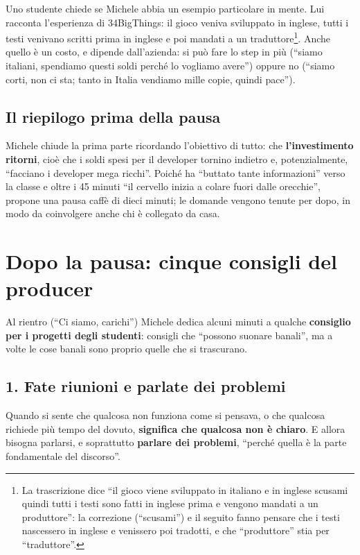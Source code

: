 Uno studente chiede se Michele abbia un esempio particolare in mente. Lui
racconta l'esperienza di 34BigThings: il gioco veniva sviluppato in inglese,
tutti i testi venivano scritti prima in inglese e poi mandati a un
traduttore\footnote{La trascrizione dice ``il gioco viene sviluppato in
italiano e in inglese scusami quindi tutti i testi sono fatti in inglese prima
e vengono mandati a un produttore'': la correzione (``scusami'') e il seguito
fanno pensare che i testi nascessero in inglese e venissero poi tradotti, e che
``produttore'' stia per ``traduttore''.}. Anche quello è un costo, e dipende
dall'azienda: si può fare lo step in più (``siamo italiani, spendiamo questi
soldi perché lo vogliamo avere'') oppure no (``siamo corti, non ci sta; tanto in
Italia vendiamo mille copie, quindi pace'').

\subsection{Il riepilogo prima della pausa}

Michele chiude la prima parte ricordando l'obiettivo di tutto: che
\textbf{l'investimento ritorni}, cioè che i soldi spesi per il developer tornino
indietro e, potenzialmente, ``facciano i developer mega ricchi''. Poiché ha
``buttato tante informazioni'' verso la classe e oltre i 45 minuti ``il cervello
inizia a colare fuori dalle orecchie'', propone una pausa caffè di dieci
minuti; le domande vengono tenute per dopo, in modo da coinvolgere anche chi è
collegato da casa.

\section{Dopo la pausa: cinque consigli del producer}
\label{sec:z4-consigli}

Al rientro (``Ci siamo, carichi'') Michele dedica alcuni minuti a qualche
\textbf{consiglio per i progetti degli studenti}: consigli che ``possono suonare
banali'', ma a volte le cose banali sono proprio quelle che si trascurano.

\subsection{1. Fate riunioni e parlate dei problemi}

Quando si sente che qualcosa non funziona come si pensava, o che qualcosa
richiede più tempo del dovuto, \textbf{significa che qualcosa non è chiaro}. E
allora bisogna parlarsi, e soprattutto \textbf{parlare dei problemi}, ``perché
quella è la parte fondamentale del discorso''.

